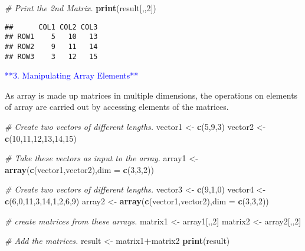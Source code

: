 \documentclass[
]{article}
\newenvironment{Shaded}{\begin{snugshade}}{\end{snugshade}}
\newcommand{\AttributeTok}[1]{\textcolor[rgb]{0.13,0.29,0.53}{#1}}
\newcommand{\CommentTok}[1]{\textcolor[rgb]{0.56,0.35,0.01}{\textit{#1}}}
\newcommand{\DecValTok}[1]{\textcolor[rgb]{0.00,0.00,0.81}{#1}}
\newcommand{\FunctionTok}[1]{\textcolor[rgb]{0.13,0.29,0.53}{\textbf{#1}}}
\newcommand{\NormalTok}[1]{#1}
\newcommand{\OtherTok}[1]{\textcolor[rgb]{0.56,0.35,0.01}{#1}}
\newcommand{\SpecialCharTok}[1]{\textcolor[rgb]{0.81,0.36,0.00}{\textbf{#1}}}
\begin{document}
\begin{Shaded}
\begin{Highlighting}[]
\CommentTok{\# Print the 2nd Matrix.}
\FunctionTok{print}\NormalTok{(result[,,}\DecValTok{2}\NormalTok{])}
\end{Highlighting}
\end{Shaded}

\begin{verbatim}
##      COL1 COL2 COL3
## ROW1    5   10   13
## ROW2    9   11   14
## ROW3    3   12   15
\end{verbatim}

\textcolor{blue}{**3. Manipulating Array Elements**}

As array is made up matrices in multiple dimensions, the operations on
elements of array are carried out by accessing elements of the matrices.

\begin{Shaded}
\begin{Highlighting}[]
\CommentTok{\# Create two vectors of different lengths.}
\NormalTok{vector1 }\OtherTok{\textless{}{-}} \FunctionTok{c}\NormalTok{(}\DecValTok{5}\NormalTok{,}\DecValTok{9}\NormalTok{,}\DecValTok{3}\NormalTok{)}
\NormalTok{vector2 }\OtherTok{\textless{}{-}} \FunctionTok{c}\NormalTok{(}\DecValTok{10}\NormalTok{,}\DecValTok{11}\NormalTok{,}\DecValTok{12}\NormalTok{,}\DecValTok{13}\NormalTok{,}\DecValTok{14}\NormalTok{,}\DecValTok{15}\NormalTok{)}

\CommentTok{\# Take these vectors as input to the array.}
\NormalTok{array1 }\OtherTok{\textless{}{-}} \FunctionTok{array}\NormalTok{(}\FunctionTok{c}\NormalTok{(vector1,vector2),}\AttributeTok{dim =} \FunctionTok{c}\NormalTok{(}\DecValTok{3}\NormalTok{,}\DecValTok{3}\NormalTok{,}\DecValTok{2}\NormalTok{))}

\CommentTok{\# Create two vectors of different lengths.}
\NormalTok{vector3 }\OtherTok{\textless{}{-}} \FunctionTok{c}\NormalTok{(}\DecValTok{9}\NormalTok{,}\DecValTok{1}\NormalTok{,}\DecValTok{0}\NormalTok{)}
\NormalTok{vector4 }\OtherTok{\textless{}{-}} \FunctionTok{c}\NormalTok{(}\DecValTok{6}\NormalTok{,}\DecValTok{0}\NormalTok{,}\DecValTok{11}\NormalTok{,}\DecValTok{3}\NormalTok{,}\DecValTok{14}\NormalTok{,}\DecValTok{1}\NormalTok{,}\DecValTok{2}\NormalTok{,}\DecValTok{6}\NormalTok{,}\DecValTok{9}\NormalTok{)}
\NormalTok{array2 }\OtherTok{\textless{}{-}} \FunctionTok{array}\NormalTok{(}\FunctionTok{c}\NormalTok{(vector1,vector2),}\AttributeTok{dim =} \FunctionTok{c}\NormalTok{(}\DecValTok{3}\NormalTok{,}\DecValTok{3}\NormalTok{,}\DecValTok{2}\NormalTok{))}

\CommentTok{\# create matrices from these arrays.}
\NormalTok{matrix1 }\OtherTok{\textless{}{-}}\NormalTok{ array1[,,}\DecValTok{2}\NormalTok{]}
\NormalTok{matrix2 }\OtherTok{\textless{}{-}}\NormalTok{ array2[,,}\DecValTok{2}\NormalTok{]}

\CommentTok{\# Add the matrices.}
\NormalTok{result }\OtherTok{\textless{}{-}}\NormalTok{ matrix1}\SpecialCharTok{+}\NormalTok{matrix2}
\FunctionTok{print}\NormalTok{(result)}
\end{Highlighting}
\end{Shaded}
\end{document}
